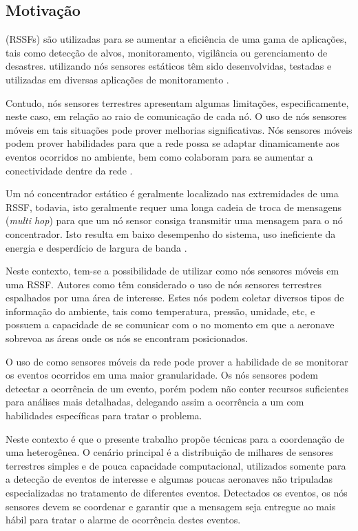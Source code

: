
\subsection{Motivação}
\wsn (RSSFs) são utilizadas para se aumentar a eficiência de uma gama de
aplicações, tais como detecção de alvos, monitoramento, vigilância ou
gerenciamento de desastres. \rssfs utilizando nós sensores estáticos têm sido
desenvolvidas, testadas e utilizadas em diversas aplicações de monitoramento
\cite{Mainwaring2002}.

Contudo, nós sensores terrestres apresentam algumas limitações, especificamente,
neste caso, em relação ao raio de comunicação de cada nó. O uso de nós sensores
móveis em tais situações pode prover melhorias significativas. Nós sensores
móveis podem prover habilidades para que a rede possa se adaptar dinamicamente
aos eventos ocorridos no ambiente, bem como colaboram para se aumentar a
conectividade dentre da rede  \cite{Aware}.

Um nó concentrador estático é geralmente localizado nas extremidades de uma
RSSF, todavia, isto geralmente requer uma longa cadeia de troca de mensagens
(\emph{multi hop}) para que um nó sensor consiga transmitir uma mensagem para o
nó concentrador. Isto resulta em baixo desempenho do sistema, uso ineficiente da
energia e desperdício de largura de banda \cite{Chang2007}.

Neste contexto, tem-se a possibilidade de utilizar \vants como nós sensores
móveis em uma RSSF. Autores como \cite{Lucchi2007} têm considerado o uso de nós
sensores terrestres espalhados por uma área de interesse. Estes nós podem
coletar diversos tipos de informação do ambiente, tais como temperatura,
pressão, umidade, etc, e possuem a capacidade de se comunicar com o \vant no
momento em que a aeronave sobrevoa as áreas onde os nós se encontram
posicionados.

O uso de \vants como sensores móveis da rede pode prover a habilidade de se
monitorar os eventos ocorridos em uma maior granularidade. Os nós sensores podem
detectar a ocorrência de um evento, porém podem não conter recursos suficientes
para análises mais detalhadas, delegando assim a ocorrência a um \vant com
habilidades específicas para tratar o problema.

Neste contexto é que o presente trabalho propõe técnicas para a coordenação de
uma \rssf heterogênea. O cenário principal é a distribuição de milhares de
sensores terrestres simples e de pouca capacidade computacional, utilizados
somente para a detecção de eventos de interesse e algumas poucas aeronaves não
tripuladas especializadas no tratamento de diferentes eventos. Detectados os
eventos, os nós sensores devem se coordenar e garantir que a mensagem seja
entregue ao \vant mais hábil para tratar o alarme de ocorrência destes eventos.


